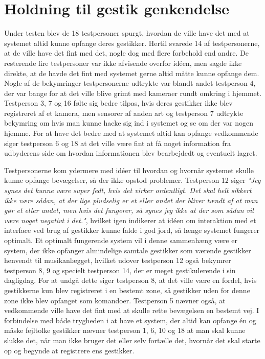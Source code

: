 \section{Holdning til gestik genkendelse}
\label{TestresultaterOvervaagning}
%
Under testen blev de 18 testpersoner spurgt, hvordan de ville have det med at systemet altid kunne opfange deres gestikker. Hertil svarede 14 af testpersonerne, at de ville have det fint med det, nogle dog med flere forbehold end andre. De resterende fire testpersoner var ikke afvisende overfor idéen, men sagde ikke direkte, at de havde det fint med systemet gerne altid måtte kunne opfange dem. Nogle af de bekymringer testpersonerne udtrykte var blandt andet testperson 4, der var bange for at det ville blive grimt med kameraer rundt omkring i hjemmet. Testperson 3, 7 og 16 følte sig bedre tilpas, hvis deres gestikker ikke blev registreret af et kamera, men sensorer af anden art og testperson 7 udtrykte bekymring om hvis man kunne hacke sig ind i systemet og se om der var nogen hjemme. For at have det bedre med at systemet altid kan opfange vedkommende siger testperson 6 og 18 at det ville være fint at få noget information fra udbyderens side om hvordan informationen blev bearbejdedt og eventuelt lagret. 

Testpersonerne kom ydermere med idéer til hvordan og hvornår systemet skulle kunne opfange bevægelser, så der ikke opstod problemer. Testperson 12 siger \textsl{"Jeg synes det kunne være super fedt, hvis det virker ordentligt. Det skal helt sikkert ikke være sådan, at der lige pludselig er et eller andet der bliver tændt af at man gør et eller andet, men hvis det fungerer, så synes jeg ikke at der som sådan vil være noget negativt i det."}, hvilket igen indikerer at idéen om interaktion med et interface ved brug af gestikker kunne falde i god jord, så længe systemet fungerer optimalt. Et optimalt fungerende system vil i denne sammenhæng være er system, der ikke opfanger almindelige samtale gestikker som værende gestikker henvendt til musikanlægget, hvilket udover testperson 12 også bekymrer testperson 8, 9 og specielt testperson 14, der er meget gestikulerende i sin dagligdag. For at undgå dette siger testperson 8, at det ville være en fordel, hvis gestikkerne kun blev registreret i en bestemt zone, så gestikker uden for denne zone ikke blev opfanget som komandoer. Testperson 5 nævner også, at vedkommende ville have det fint med at skulle rette bevægelsen en bestemt vej. I forbindelse med både trygheden i at have et system, der altid kan opfange én og måske fejltolke gestikker nævner testperson 1, 6, 10 og 18 at man skal kunne slukke det, når man ikke bruger det eller selv fortælle det, hvornår det skal starte op og begynde at registrere ens gestikker. \blankline

